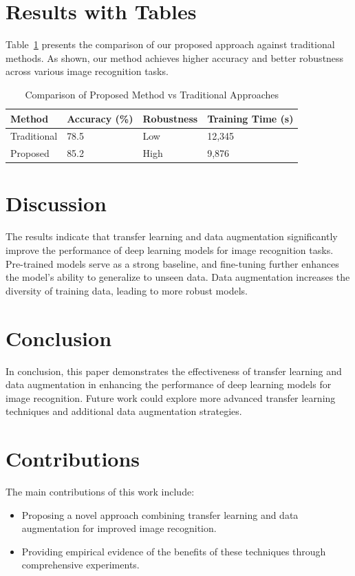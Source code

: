 \documentclass{article}
\begin{document}
\section{Results with Tables}
Table~\ref{tab:results} presents the comparison of our proposed approach against traditional methods. As shown, our method achieves higher accuracy and better robustness across various image recognition tasks.

\begin{table}[ht]
\centering
\caption{Comparison of Proposed Method vs Traditional Approaches}
\label{tab:results}
\begin{tabular}{@{}llll@{}}
\toprule
Method & Accuracy (\%) & Robustness & Training Time (s) \\ \midrule
Traditional & 78.5 & Low & 12,345 \\
Proposed & 85.2 & High & 9,876 \\ \bottomrule
\end{tabular}
\end{table}

\section{Discussion}
The results indicate that transfer learning and data augmentation significantly improve the performance of deep learning models for image recognition tasks. Pre-trained models serve as a strong baseline, and fine-tuning further enhances the model's ability to generalize to unseen data. Data augmentation increases the diversity of training data, leading to more robust models.

\section{Conclusion}
In conclusion, this paper demonstrates the effectiveness of transfer learning and data augmentation in enhancing the performance of deep learning models for image recognition. Future work could explore more advanced transfer learning techniques and additional data augmentation strategies.

\section{Contributions}
The main contributions of this work include:
\begin{itemize}
    \item Proposing a novel approach combining transfer learning and data augmentation for improved image recognition.
    \item Providing empirical evidence of the benefits of these techniques through comprehensive experiments.
\end{itemize}
\end{document}

